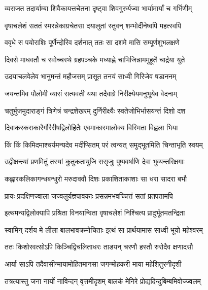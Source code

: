 
\addtocounter{shlokacount}{33}

\twolineshloka
{व्यराजत तदार्याम्बा शिवैकायत्तचेतना}
{दृष्ट्वा शिवगुरुर्यज्वा भार्यामार्यां च गर्भिणीम्} %

\twolineshloka
{वृषाचलेशं सततं स्मरन्नेकाग्रचेतसा}
{दयालुतां स्तुवन् शम्भोर्दीनेष्वपि महत्स्वपि} %

\twolineshloka
{ववृधे स पयोराशिः पूर्णेन्दोरिव दर्शनात्}
{ततः सा दशमे मासि सम्पूर्णशुभलक्षणे} %

\twolineshloka
{दिवसे माधवर्तौ च स्वोच्चस्थे ग्रहपञ्चके}
{मध्याह्ने चाभिजिन्नाममुहूर्ते चार्द्रया युते} %

\twolineshloka
{उदयाचलवेलेव भानुमन्तं महौजसम्}
{प्रासूत तनयं साध्वी गिरिजेव षडाननम्} %

\twolineshloka
{जयन्तमिव पौलोमी व्यासं सत्यवती यथा}
{तदैवाग्रे निरीक्ष्येयमनुभूयेव वेदनाम्} %

\twolineshloka
{चतुर्भुजमुदाराङ्गं त्रिणेत्रं चन्द्रशेखरम्}
{दुर्निरीक्ष्यैः स्वतेजोभिर्भासयन्तं दिशो दश} %

\twolineshloka
{दिवाकरकराकारैर्गौरैरीषद्विलोहितैः}
{एवमाकारमालोक्य विस्मिता विह्वला भिया} %

\twolineshloka
{किं किं किमिदमाश्चर्यमन्यदेव मदीप्सितम्}
{परं त्वन्यत् समुद्भूतमिति चिन्ताभृति स्वयम्} %

\twolineshloka
{उद्वीक्षन्त्यां प्रणमितुं तस्यां कुतुकतायुजि}
{ससृजुः पुष्पवर्षाणि देवा भुव्यन्तरिक्षगाः} %

\twolineshloka
{कह्लारकलिकागन्धबन्धुरो मरुदाववौ}
{दिशः प्रकाशिताकाशाः सा धरा सादरा बभौ} %

\twolineshloka
{प्रायः प्रदक्षिणज्वाला जज्वलुर्यज्ञपावकाः}
{प्रसन्नमभवच्चित्तं सतां प्रतपतामपि} %

\twolineshloka
{इत्थमन्यद्विलोक्यापि प्रश्रिता विनयान्विता}
{वृषाचलेशं निश्चित्य प्रादुर्भूतमतन्द्रिता} %

\twolineshloka
{स्वामिन् दर्शय मे लीला बालभावक्रमोचिताः}
{इत्थं सा प्रार्थयामास साध्वी भूयो महेश्वरम्} %

\twolineshloka
{ततः किशोरवत्सोऽपि किञ्चिद्विचलिताधरः}
{ताडयन् चरणौ हस्तौ रुरोदैव क्षणादसौ} %

\twolineshloka
{आर्या साऽपि तदैवासीन्मायामोहितमानसा}
{जगन्मोहकरी माया महेशितुरनीदृशी} %

\twolineshloka
{तत्रत्यास्तु जना नार्यो नाविन्दन् वृत्तमीदृशम्}
{बालकं मेनिरे प्रोद्यदिन्दुबिम्बमिवोज्ज्वलम्} %

